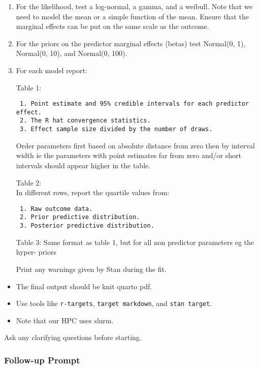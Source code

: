 \documentclass[
  letterpaper,
]{article}
\begin{document}
\begin{enumerate}
\def\labelenumi{\arabic{enumi}.}
\item
  For the likelihood, test a log-normal, a gamma, and a weibull. Note
  that we need to model the mean or a simple function of the mean.
  Ensure that the marginal effects can be put on the same scale as the
  outcome.
\item
  For the priors on the predictor marginal effects (betas) test
  Normal(0, 1), Normal(0, 10), and Normal(0, 100).
\item
  For each model report:

  Table 1:

\begin{verbatim}
 1. Point estimate and 95% credible intervals for each predictor effect. 
 2. The R hat convergence statistics.  
 3. Effect sample size divided by the number of draws.  
\end{verbatim}

  Order parameters first based on absolute distance from zero then by
  interval width ie the parameters with point estimates far from zero
  and/or short intervals should appear higher in the table.

  Table 2:\\
  In different rows, report the quartile values from:

\begin{verbatim}
 1. Raw outcome data.   
 2. Prior predictive distribution. 
 3. Posterior predictive distribution. 
\end{verbatim}

  Table 3: Same format as table 1, but for all non predictor parameters
  eg the hyper- priors

  Print any warnings given by Stan during the fit.
\end{enumerate}

\begin{itemize}
\item
  The final output should be knit quarto pdf.
\item
  Use tools like \texttt{r-targets}, \texttt{target\ markdown}, and
  \texttt{stan\ target}.
\item
  Note that our HPC uses slurm.
\end{itemize}

Ask any clarifying questions before starting.

\subsubsection{Follow-up Prompt}\label{follow-up-prompt}
\end{document}
